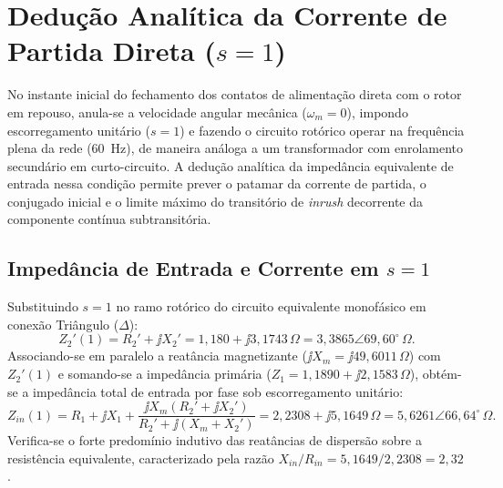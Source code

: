 \section{Dedução Analítica da Corrente de Partida Direta ($s = 1$)}\label{sec:partida_bloqueado}

No instante inicial do fechamento dos contatos de alimentação direta com o rotor em repouso, anula-se a velocidade angular mecânica ($\omega_m = 0$), impondo escorregamento unitário ($s = 1$) e fazendo o circuito rotórico operar na frequência plena da rede (\SI{60}{\hertz}), de maneira análoga a um transformador com enrolamento secundário em curto-circuito. A dedução analítica da impedância equivalente de entrada nessa condição permite prever o patamar da corrente de partida, o conjugado inicial e o limite máximo do transitório de \textit{inrush} decorrente da componente contínua subtransitória.

\subsection{Impedância de Entrada e Corrente em $s = 1$}\label{subsec:impedancia_s1}

Substituindo $s = 1$ no ramo rotórico do circuito equivalente monofásico em conexão Triângulo ($\Delta$):
\begin{equation}
Z_2'(1) = R_2' + \jj X_2' = 1{,}180 + \jj 3{,}1743\,\Omega = 3{,}3865 \angle 69{,}60^\circ\,\Omega.
\label{eq:z2_bloqueado}
\end{equation}
Associando-se em paralelo a reatância magnetizante ($\jj X_m = \jj 49{,}6011\,\Omega$) com $Z_2'(1)$ e somando-se a impedância primária ($Z_1 = 1{,}1890 + \jj 2{,}1583\,\Omega$), obtém-se a impedância total de entrada por fase sob escorregamento unitário:
\begin{equation}
Z_{in}(1) = R_1 + \jj X_1 + \frac{\jj X_m (R_2' + \jj X_2')}{R_2' + \jj (X_m + X_2')} = 2{,}2308 + \jj 5{,}1649\,\Omega = 5{,}6261 \angle 66{,}64^\circ\,\Omega.
\label{eq:zin_bloqueado}
\end{equation}
Verifica-se o forte predomínio indutivo das reatâncias de dispersão sobre a resistência equivalente, caracterizado pela razão $X_{in}/R_{in} = 5{,}1649 / 2{,}2308 = 2{,}32$.

